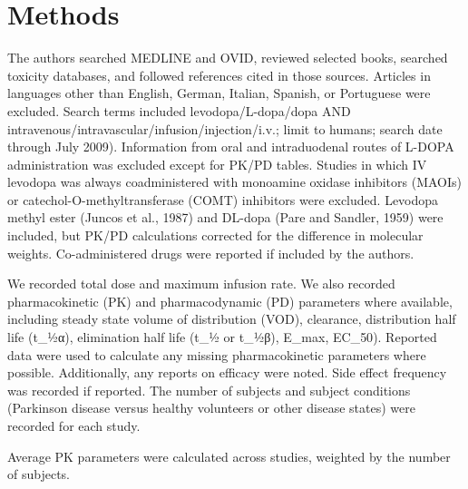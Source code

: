 \section{Methods}
The authors searched MEDLINE and OVID, reviewed selected books, searched toxicity databases, and followed references cited in those sources. Articles in languages other than English, German, Italian, Spanish, or Portuguese were excluded. Search terms included levodopa/L-dopa/dopa AND intravenous/intravascular/infusion/injection/i.v.; limit to humans; search date through July 2009). Information from oral and intraduodenal routes of L-DOPA administration was excluded except for PK/PD tables.  Studies in which IV levodopa was always coadministered with monoamine oxidase inhibitors (MAOIs) or catechol-O-methyltransferase (COMT) inhibitors were excluded.  Levodopa methyl ester (Juncos et al., 1987) and DL-dopa (Pare and Sandler, 1959) were included, but PK/PD calculations corrected for the difference in molecular weights.  Co-administered drugs were reported if included by the authors.

We recorded total dose and maximum infusion rate.  We also recorded pharmacokinetic (PK) and pharmacodynamic (PD) parameters where available, including steady state volume of distribution (VOD), clearance, distribution half life (t_{½α}), elimination half life (t_½ or t_{½β}), E_{max}, EC_{50}).   Reported data were used to calculate any missing pharmacokinetic parameters where possible.  Additionally, any reports on efficacy were noted.  Side effect frequency was recorded if reported. The number of subjects and subject conditions (Parkinson disease versus healthy volunteers or other disease states) were recorded for each study. 

Average PK parameters were calculated across studies, weighted by the number of subjects.
